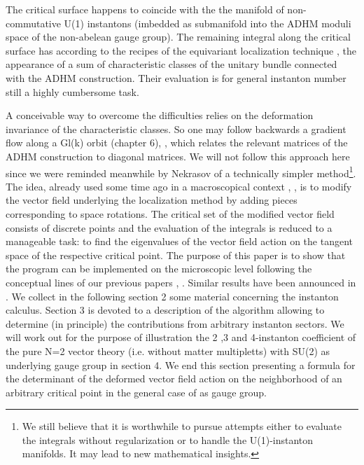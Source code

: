 \documentclass[a4paper,12pt]{article}
\begin{document}
The critical surface happens to coincide with the the manifold of
non-commutative U(1) instantons (imbedded as submanifold into the
ADHM moduli space of the non-abelean gauge group). The remaining
integral along the critical surface has according to the recipes
of the equivariant localization technique \cite{B}, \cite{BGV} the
appearance of a sum of characteristic classes of the unitary
bundle connected with the ADHM construction. Their evaluation is
for general instanton number still a highly cumbersome task.

A conceivable way to overcome the difficulties relies on the
deformation invariance of the characteristic classes. So one may
follow backwards a gradient flow along a Gl(k) orbit \cite{DK}
(chapter 6), \cite{Nak}, which relates the relevant matrices of
the ADHM construction to diagonal matrices. We will not follow
this approach here since we were reminded meanwhile by Nekrasov
\cite{N} of a technically simpler method\footnote{We still believe
that it is worthwhile to pursue attempts either to evaluate the
integrals without regularization or to handle the U(1)-instanton
manifolds. It may lead to new mathematical insights.}. The idea,
already used some time ago in a macroscopical context
\cite{MNSch1}, \cite{MNSch2}, is to modify the vector field
underlying the localization method by adding pieces corresponding
to space rotations. The critical set of the modified vector field
consists of discrete points and the evaluation of the integrals is
reduced to a manageable task: to find the eigenvalues of the
vector field action on the tangent space of the respective
critical point. The purpose of this paper is to show that the
program can be implemented on the microscopic level following the
conceptual lines of our previous papers \cite{FPS1}, \cite{FPS2}.
Similar results have been announced in \cite{N}. We collect in the
following section 2 some material concerning the instanton
calculus. Section 3 is devoted to a description of the algorithm
allowing to determine (in principle) the contributions from
arbitrary instanton sectors. We will work out for the purpose of
illustration the 2 ,3 and 4-instanton coefficient of the pure N=2
vector theory (i.e. without matter multipletts) with SU(2) as
underlying gauge group in section 4. We end this section
presenting a formula for the determinant of the deformed vector
field action on the neighborhood of an arbitrary critical point in
the general case of \coordHE{} as gauge group.

\setcounter{equation}{0}
\end{document}
